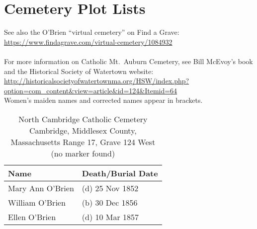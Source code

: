 \chapter{Cemetery Plot Lists}

\setlength{\parindent}{0cm}

See also the O'Brien ``virtual cemetery'' on Find a Grave: \url{https://www.findagrave.com/virtual-cemetery/1084932}\\
\\
For more information on Catholic Mt.\ Auburn Cemetery, see Bill McEvoy's book and the Historical Society of Watertown website: \url{http://historicalsocietyofwatertownma.org/HSW/index.php?option=com_content&view=article&id=124&Itemid=64}
\\
Women's maiden names and corrected names appear in brackets.

\begin{table}[ht]
	\centering
		\caption{North Cambridge Catholic Cemetery\cite{DianaBerberenaLetter1:3} \\
		Cambridge, Middlesex County, Massachusetts
		Range 17, Grave 124 West (no marker found)}
	\begin{tabular}{|l|l|}
		\hline
		\textbf{Name} & \textbf{Death/Burial Date} \\
		\hline
	Mary Ann O'Brien\index{O'Brien!Mary Ann\textsuperscript{3} (1852--1852)} & (d) 25 Nov 1852 \\
	\hline
	William O'Brien\index{O'Brien!William\textsuperscript{1}} & (b) 30 Dec 1856 \\
	\hline
	Ellen O'Brien\index{O'Brien!Ellen\textsuperscript{3} (1853--1857)} & (d) 10 Mar 1857 \\
	\hline
	\end{tabular}
\end{table}

